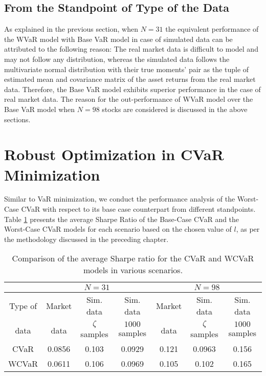 \subsection{From the Standpoint of Type of the Data}

As explained in the previous section, when $N=31$ the equivalent performance of the WVaR model with Base VaR model in case of simulated data can be attributed to the following reason: The real market data is difficult to model and may not follow any distribution, whereas the simulated data follows the multivariate normal distribution with their true moments' pair as the tuple of estimated mean and covariance matrix of the asset returns from the real market data. Therefore, the Base VaR model exhibits superior performance in the case of real market data. The reason for the out-performance of WVaR model over the Base VaR model when $N=98$ stocks are considered is discussed in the above sections.

\section{Robust Optimization in CVaR Minimization}

Similar to VaR minimization, we conduct the performance analysis of the Worst-Case CVaR with respect to its base case counterpart from different standpoints. Table \ref{tab:cvar_conc} presents the average Sharpe Ratio of the Base-Case CVaR and the Worst-Case CVaR models for each scenario based on the chosen value of $l$, as per the methodology discussed in the preceding chapter.

\begin{table}[!h]
  \centering
  \small
    \captionsetup{justification=centering}
  \begin{tabular}{|c|c|c|c|c|c|c|}
    \hline
   \multirow{2}{*}{} $N$ &
      \multicolumn{3}{c|}{$N=31$} &
      \multicolumn{3}{c|}{$N=98$}  \\
    \hline
    Type of & Market & Sim. data & Sim. data & Market & Sim. data & Sim. data \\
    data & data & $\zeta$ samples & $1000$ samples & data & $\zeta$ samples & $1000$ samples \\
    \hline
    CVaR & 0.0856 & 0.103 & 0.0929 & 0.121 & 0.0963 & 0.156 \\
    \hline
    WCVaR & 0.0611 & 0.106 & 0.0969 & 0.105 & 0.102 & 0.165 \\
    \hline
  \end{tabular}
  \caption{Comparison of the average Sharpe ratio for the CVaR and WCVaR models in various scenarios.}
  \label{tab:cvar_conc}
\end{table}

